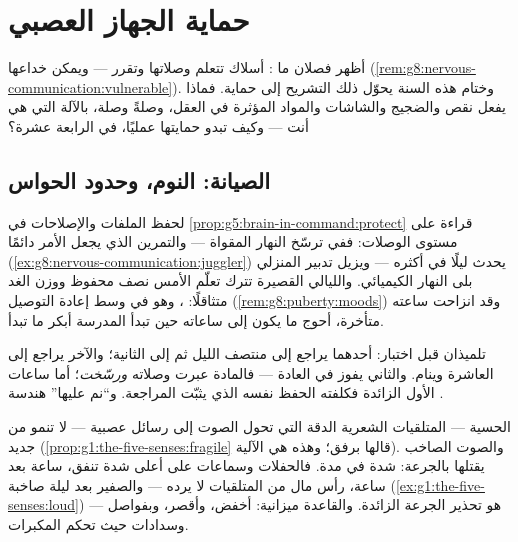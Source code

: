 \chapter{حماية الجهاز العصبي}\label{ch:g8:protecting-the-nervous-system}

أظهر فصلان ما : أسلاك تتعلم وصلاتها وتقرر
--- ويمكن خداعها
(\cref{rem:g8:nervous-communication:vulnerable}). وختام
هذه السنة يحوّل ذلك التشريح إلى حماية. فماذا يفعل نقص
 والضجيج والشاشات والمواد المؤثرة في العقل، وصلةً
وصلة، بالآلة التي هي أنت --- وكيف تبدو حمايتها عمليًا،
في الرابعة عشرة؟

\section{الصيانة: النوم، وحدود الحواس}

\begin{proposition}\label{prop:g8:protecting-the-nervous-system:sleep}
لحفظ الملفات والإصلاحات في
\cref{prop:g5:brain-in-command:protect} قراءة على مستوى
الوصلات: ففي  ترسّخ  النهار المقواة ---
والتمرين الذي يجعل الأمر دائمًا
(\cref{ex:g8:nervous-communication:juggler}) يحدث ليلًا
في أكثره --- ويزيل تدبير  المنزلي بلى النهار
الكيميائي. والليالي القصيرة تترك تعلّم الأمس نصف محفوظ
ووزن الغد متثاقلًا:  ، وهو في وسط إعادة
التوصيل (\cref{rem:g8:puberty:moods}) وقد انزاحت ساعته
متأخرة، أحوج ما يكون إلى ساعاته حين تبدأ المدرسة أبكر
ما تبدأ.
\end{proposition}
\admitted

\begin{example}\label{ex:g8:protecting-the-nervous-system:revision}
تلميذان قبل اختبار: أحدهما يراجع إلى منتصف الليل ثم إلى
الثانية؛ والآخر يراجع إلى العاشرة وينام. والثاني يفوز في
العادة --- فالمادة عبرت وصلاته \emph{ورسّخت}؛ أما ساعات
الأول الزائدة فكلفته الحفظ نفسه الذي يثبّت المراجعة.
و``نم عليها'' هندسة .
\end{example}

\begin{proposition}\label{prop:g8:protecting-the-nervous-system:noise}
  الحسية --- المتلقيات الشعرية الدقة التي تحول
الصوت إلى رسائل عصبية --- لا تنمو من جديد
(\cref{prop:g1:the-five-senses:fragile} قالها برفق؛ وهذه
هي الآلية). والصوت الصاخب يقتلها بالجرعة: شدة في مدة.
فالحفلات وسماعات  على أعلى شدة تنفق، ساعة بعد
ساعة، رأس مال من المتلقيات لا يرده  --- والصفير بعد
ليلة صاخبة (\cref{ex:g1:the-five-senses:loud}) هو تحذير
الجرعة الزائدة. والقاعدة ميزانية: أخفض، وأقصر، وبفواصل
--- وسدادات  حيث تحكم المكبرات.
\end{proposition}
\admitted

